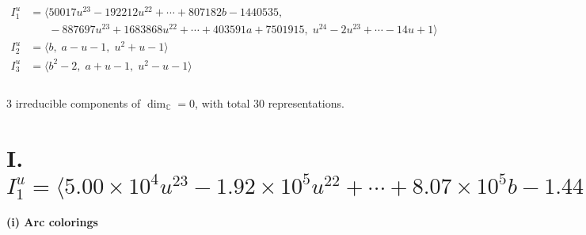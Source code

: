 \documentclass[1p]{elsarticle_modified}
\theoremstyle{definition}
\begin{document}
\begin{align*}
I^u_{1}&=\langle 
50017 u^{23}-192212 u^{22}+\cdots+807182 b-1440535,\\
\phantom{I^u_{1}}&\phantom{= \langle  }-887697 u^{23}+1683868 u^{22}+\cdots+403591 a+7501915,\;u^{24}-2 u^{23}+\cdots-14 u+1\rangle \\
I^u_{2}&=\langle 
b,\;a- u-1,\;u^2+u-1\rangle \\
I^u_{3}&=\langle 
b^2-2,\;a+u-1,\;u^2- u-1\rangle \\
\\
\end{align*}
\raggedright * 3 irreducible components of $\dim_{\mathbb{C}}=0$, with total 30 representations.\\
\newpage
\renewcommand{\arraystretch}{1}
\centering \section*{I. $I^u_{1}= \langle 5.00\times10^{4} u^{23}-1.92\times10^{5} u^{22}+\cdots+8.07\times10^{5} b-1.44\times10^{6},\;-8.88\times10^{5} u^{23}+1.68\times10^{6} u^{22}+\cdots+4.04\times10^{5} a+7.50\times10^{6},\;u^{24}-2 u^{23}+\cdots-14 u+1 \rangle$}
\flushleft \textbf{(i) Arc colorings}\\
\end{document}
